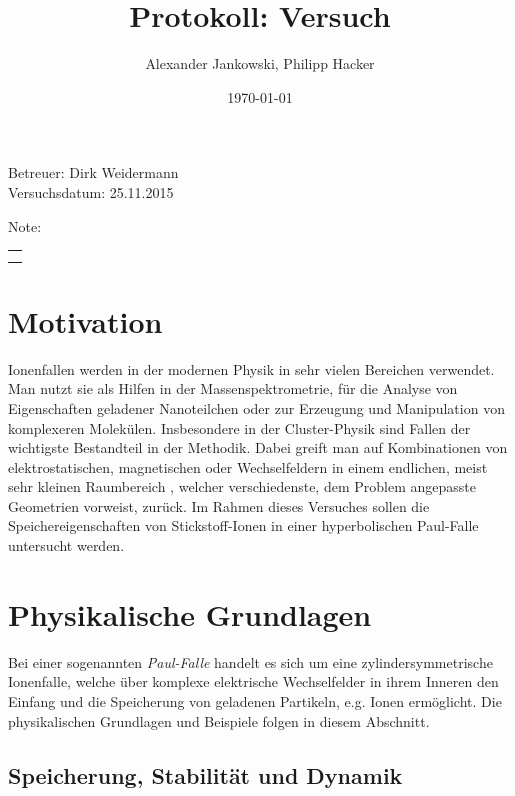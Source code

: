 \documentclass[numbers=noenddot,a4paper,notitlepage,twoside,BCOR15mm]{scrartcl}
\title{Protokoll: Versuch} %
\author{Alexander Jankowski, Philipp Hacker}
\date{\today}
\newcommand{\tilt}[1]{\textit{#1}}
\begin{document}
	\maketitle
	\begin{center}
		Betreuer: Dirk Weidermann \\ %
		Versuchsdatum: 25.11.2015 \\ %
		\begin{table}[h]
			\centering
			Note: %
			\begin{tabularx}{1.5cm}{|X|}
				\hline \\ \\
				\hline
			\end{tabularx}
		\end{table}
	\end{center}
	\vspace*{\fill}
	\tableofcontents
	\vfill
	\clearpage
	\section{Motivation}

		Ionenfallen werden in der modernen Physik in sehr vielen Bereichen verwendet. Man nutzt sie als Hilfen in der Massenspektrometrie, für die Analyse von Eigenschaften geladener Nanoteilchen oder zur Erzeugung und Manipulation von komplexeren Molekülen. Insbesondere in der Cluster-Physik sind Fallen der wichtigste Bestandteil in der Methodik. Dabei greift man auf Kombinationen von elektrostatischen, magnetischen oder Wechselfeldern in einem endlichen, meist sehr kleinen Raumbereich , welcher verschiedenste, dem Problem angepasste Geometrien vorweist, zurück. Im Rahmen dieses Versuches sollen die Speichereigenschaften von Stickstoff-Ionen in einer hyperbolischen Paul-Falle untersucht werden. 


	\clearpage
	\section{Physikalische Grundlagen}

		Bei einer sogenannten \tilt{Paul-Falle} handelt es sich um eine zylindersymmetrische Ionenfalle, welche über komplexe elektrische Wechselfelder in ihrem Inneren den Einfang und die Speicherung von geladenen Partikeln, e.g. Ionen ermöglicht. Die physikalischen Grundlagen und Beispiele folgen in diesem Abschnitt.

		\subsection{Speicherung, Stabilität und Dynamik}
\end{document}
